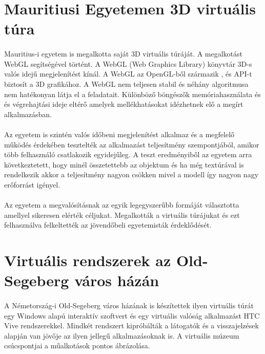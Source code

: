 \section{Mauritiusi Egyetemen 3D virtuális túra}
\paragraph{} 
Mauritius-i egyetem \cite{moloo20163d} is megalkotta saját 3D virtuális túráját. A megalkotást WebGL segítségével történt. A WebGL (Web Graphics Library) könyvtár 3D-s valós idejű megjelenítést kínál. A WebGL az OpenGL-ből származik , és API-t biztosít a 3D grafikához.  A WebGL nem teljesen stabil  és néhány algoritmusa nem hatékonyan látja el a feladatait. Különböző böngészők memóriahasználata és és végrehajtási ideje eltérő amelyek mellékhatásokat idézhetnek elő a megírt alkalmazásban.
\paragraph{}
Az egyetem is szintén valós időbeni megjelenítést alkalmaz és a megfelelő működés érdekében tesztelték az alkalmazást teljesítmény szempontjából, amikor több felhasználó csatlakozik egyidejűleg.  A teszt eredményiből az egyetem arra következtetett, hogy minél összetettebb az objektum és ha még textúrával is rendelkezik akkor a teljesítmény nagyon csökken mivel a modell így nagyon nagy erőforrást igényel. 
\paragraph{}
Az egyetem a megvalósításnak az egyik legegyszerűbb formáját választotta amellyel sikeresen elérték céljukat. Megalkották a virtuális túrájukat és ezt felhasználva felkeltették az jövendőbeli egyetemisták érdeklődését.

\section{Virtuális rendszerek az Old-Segeberg város házán}
\paragraph{}
A Németország-i Old-Segeberg \cite{kersten2017development} város házának is készítettek ilyen virtuális túrát egy Windows alapú interaktív szoftvert és egy virtuális valóság alkalmazást HTC Vive rendszerekkel. Mindkét rendszert kipróbálták a látogatók és a visszajelzések alapján van jövője az ilyen jellegű alkalmazásoknak is. A virtuális múzeum csúcspontjai a műalkotások pontos ábrázolása. 
